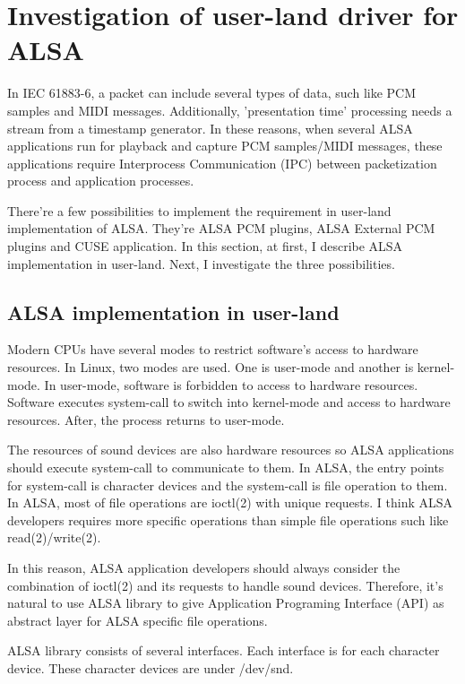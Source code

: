 \documentclass[onecolumn]{article}
\begin{document}
\section{Investigation of user-land driver for ALSA}

In IEC 61883-6\cite{iec61883-6-1,iec61883-6-2}, a packet can include several types of data, such like PCM samples and MIDI messages. Additionally, 'presentation time' processing needs a stream from a timestamp generator. In these reasons, when several ALSA applications run for playback and capture PCM samples/MIDI messages, these applications require Interprocess Communication (IPC) between packetization process and application processes.

There're a few possibilities to implement the requirement in user-land implementation of ALSA. They're ALSA PCM plugins, ALSA External PCM plugins and CUSE application. In this section, at first, I describe ALSA implementation in user-land. Next, I investigate the three possibilities.

\subsection{ALSA implementation in user-land}

Modern CPUs have several modes to restrict software's access to hardware resources. In Linux, two modes are used. One is user-mode and another is kernel-mode. In user-mode, software is forbidden to access to hardware resources. Software executes system-call to switch into kernel-mode and access to hardware resources. After, the process returns to user-mode.

The resources of sound devices are also hardware resources so ALSA applications should execute system-call to communicate to them. In ALSA, the entry points for system-call is character devices and the system-call is file operation to them. In ALSA, most of file operations are ioctl(2) with unique requests. I think ALSA developers requires more specific operations than simple file operations such like read(2)/write(2).

In this reason, ALSA application developers should always consider the combination of ioctl(2) and its requests to handle sound devices. Therefore, it's natural to use ALSA library to give Application Programing Interface (API) as abstract layer for ALSA specific file operations.

ALSA library consists of several interfaces. Each interface is for each character device. These character devices are under /dev/snd.
\end{document}
